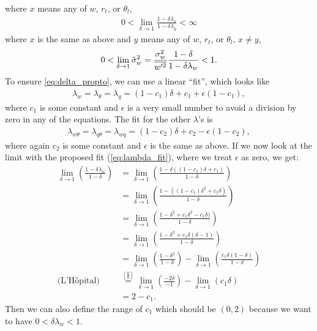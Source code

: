 where $x$ means any of $w$, $r_t$, or $\theta_l$,
\begin{align}
    0 < \lim_{\delta\to 1} \frac{1-\delta\lambda_x}{1-\delta\lambda_y} < \infty
\end{align}
where $x$ is the same as above and $y$ means any of $w$, $r_t$, or $\theta_l$, $x \neq y$,
\begin{align}
    0 < \lim_{\delta \to 1} {\tilde{\sigma}_w}^2 = \frac{\sigma_w^2}{\overline{w'^2}}
    \frac{1-\delta}{1-\delta \lambda_w} < 1.
\end{align}
To ensure \cref{eq:delta_propto}, we can use a linear \enquote{fit}, which looks like
\begin{align}
    \label{eq:lambda_fit}
    \lambda_w = \lambda_\theta = \lambda_q
    = (1 - c_1) \delta + c_1 + \epsilon (1 - c_1),
\end{align}
where $c_1$ is some constant and $\epsilon$ is a very small number to avoid a division by zero in any of the equations.
The fit for the other $\lambda$'s is
\begin{align}
    \label{eq:lambda_xy_fit}
    \lambda_{w\theta} = \lambda_{q\theta} = \lambda_{wq}
    = (1 - c_2) \delta + c_2 - \epsilon (1 - c_2),
\end{align}
where again $c_2$ is some constant and $\epsilon$ is the same as above.
If we now look at the limit with the proposed fit (\cref{eq:lambda_fit}), where we treat $\epsilon$ as zero, we get:
\begin{align}
    \lim_{\delta \to 1} \left(\frac{1 - \delta\lambda_w}{1 - \delta}\right)
    &= \lim_{\delta \to 1} \left(\frac{1 - \delta((1 - c_1) \delta + c_1)}{1 - \delta}\right) \\
    &= \lim_{\delta \to 1} \left(\frac{1 - ((1 - c_1) \delta^2 + c_1\delta)}{1 - \delta}\right) \\
    &= \lim_{\delta \to 1} \left(\frac{1 - \delta^2 + c_1\delta^2 - c_1\delta)}{1 - \delta}\right) \\
    &= \lim_{\delta \to 1} \left(\frac{1 - \delta^2 + c_1\delta(\delta - 1)}{1 - \delta}\right) \\
    &= \lim_{\delta \to 1} \left(\frac{1 - \delta^2}{1 - \delta}\right)
    - \lim_{\delta \to 1} \left(\frac{c_1\delta(1 - \delta)}{1 - \delta}\right) \\
    \text{(L'Hôpital)}
    &\overset{\left[\frac{0}{0}\right]}{=} \lim_{\delta \to 1} \left(\frac{-2\delta}{-1}\right)
    - \lim_{\delta \to 1} \left(c_1\delta\right) \\
    &= 2 - c_1.
\end{align}
Then we can also define the range of $c_1$ which should be $(0, 2)$ because we want to have $0 < \delta\lambda_w < 1$.

